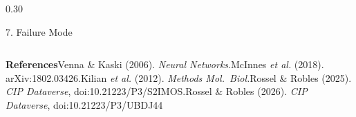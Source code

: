 \documentclass[final]{beamer}
\begin{document}
\begin{frame}[t]
\begin{columns}[T,totalwidth=\textwidth]
\begin{column}{0.30\textwidth}
\begin{block}{\strut 7. Failure Mode}
\end{block}
\end{column}

\end{columns}

\vspace{5mm}

{\footnotesize
\textbf{References}\quad
[1] Venna \& Kaski (2006). \textit{Neural Networks}.\quad
[2] McInnes \textit{et al.} (2018). arXiv:1802.03426.\quad
[3] Kilian \textit{et al.} (2012). \textit{Methods Mol.\ Biol.}\quad
[4] Rossel \& Robles (2025). \textit{CIP Dataverse}, doi:10.21223/P3/S2IMOS.\quad
[5] Rossel \& Robles (2026). \textit{CIP Dataverse}, doi:10.21223/P3/UBDJ44}

\end{frame}
\end{document}
